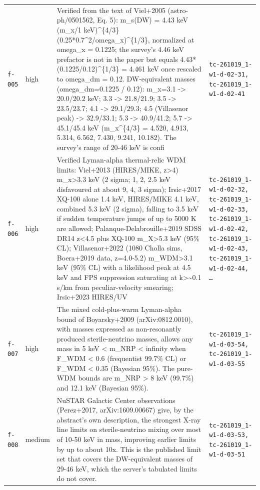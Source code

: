 \documentclass[11pt,a4paper]{article}
\begin{document}
\begin{longtable}{@{}p{}p{}p{}p{}@{}}
\texttt{f-005} & high & Verified from the text of Viel+2005 (astro-ph/0501562, Eq. 5): m\_s(DW) = 4.43 keV (m\_x/1 keV)\textasciicircum{}\{4/3\} (0.25*0.7\textasciicircum{}2/omega\_x)\textasciicircum{}\{1/3\}, normalized at omega\_x = 0.1225; the survey's 4.46 keV prefactor is not in the paper but equals 4.43*(0.1225/0.12)\textasciicircum{}\{1/3\} = 4.461 keV once rescaled to omega\_dm = 0.12. DW-equivalent masses (omega\_dm=0.1225 / 0.12): m\_x=3.1 -\textgreater{} 20.0/20.2 keV; 3.3 -\textgreater{} 21.8/21.9; 3.5 -\textgreater{} 23.5/23.7; 4.1 -\textgreater{} 29.1/29.3; 4.5 (Villasenor peak) -\textgreater{} 32.9/33.1; 5.3 -\textgreater{} 40.9/41.2; 5.7 -\textgreater{} 45.1/45.4 keV (m\_x\textasciicircum{}\{4/3\} = 4.520, 4.913, 5.314, 6.562, 7.430, 9.241, 10.182). The survey's range of 20-46 keV is confi & \texttt{tc-261019\_\allowbreak{}1-w1-d-02-31,\allowbreak{} tc-261019\_\allowbreak{}1-w1-d-02-41} \\
\texttt{f-006} & high & Verified Lyman-alpha thermal-relic WDM limits: Viel+2013 (HIRES/MIKE, z\textgreater{}4) m\_x\textgreater{}3.3 keV (2 sigma; 1, 2, 2.5 keV disfavoured at about 9, 4, 3 sigma); Irsic+2017 XQ-100 alone 1.4 keV, HIRES/MIKE 4.1 keV, combined 5.3 keV (2 sigma), falling to 3.5 keV if sudden temperature jumps of up to 5000 K are allowed; Palanque-Delabrouille+2019 SDSS DR14 z\textless{}4.5 plus XQ-100 m\_X\textgreater{}5.3 keV (95\% CL); Villasenor+2022 (1080 Cholla sims, Boera+2019 data, z=4.0-5.2) m\_WDM\textgreater{}3.1 keV (95\% CL) with a likelihood peak at 4.5 keV and FPS suppression saturating at k\textgreater{}\textasciitilde{}0.1 s/km from peculiar-velocity smearing; Irsic+2023 HIRES/UV & \texttt{tc-261019\_\allowbreak{}1-w1-d-02-32,\allowbreak{} tc-261019\_\allowbreak{}1-w1-d-02-33,\allowbreak{} tc-261019\_\allowbreak{}1-w1-d-02-42,\allowbreak{} tc-261019\_\allowbreak{}1-w1-d-02-43,\allowbreak{} tc-261019\_\allowbreak{}1-w1-d-02-44,\allowbreak{} \ldots{}\allowbreak{}} \\
\texttt{f-007} & high & The mixed cold-plus-warm Lyman-alpha bound of Boyarsky+2009 (arXiv:0812.0010), with masses expressed as non-resonantly produced sterile-neutrino masses, allows any mass in 5 keV \textless{} m\_NRP \textless{} infinity when F\_WDM \textless{} 0.6 (frequentist 99.7\% CL) or F\_WDM \textless{} 0.35 (Bayesian 95\%). The pure-WDM bounds are m\_NRP \textgreater{} 8 keV (99.7\%) and 12.1 keV (Bayesian 95\%). & \texttt{tc-261019\_\allowbreak{}1-w1-d-03-54,\allowbreak{} tc-261019\_\allowbreak{}1-w1-d-03-55} \\
\texttt{f-008} & medium & NuSTAR Galactic Center observations (Perez+2017, arXiv:1609.00667) give, by the abstract's own description, the strongest X-ray line limits on sterile-neutrino mixing over most of 10-50 keV in mass, improving earlier limits by up to about 10x. This is the published limit set that covers the DW-equivalent masses of 29-46 keV, which the server's tabulated limits do not cover. & \texttt{tc-261019\_\allowbreak{}1-w1-d-03-53,\allowbreak{} tc-261019\_\allowbreak{}1-w1-d-03-51} \\

\end{longtable}
\end{document}
